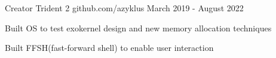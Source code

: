 \begin{cventries}
   \cventry
   {Creator} %
   {Trident 2} %
   {github.com/azyklus} %
   {March 2019 - August 2022} %
   {
      \begin{cvitems} %
         \item {Built OS to test exokernel design and new memory allocation techniques}
         \item {Built FFSH(fast-forward shell) to enable user interaction}
      \end{cvitems}
   }

\end{cventries}